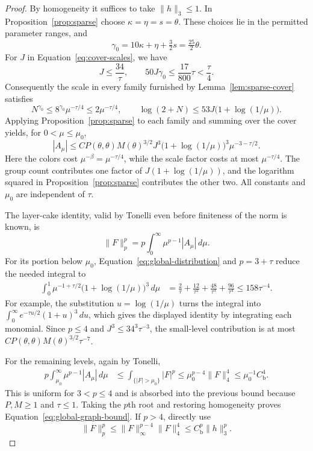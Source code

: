 \begin{proof}
By homogeneity it suffices to take $\|h\|_3\leq1$.
In Proposition~\ref{prop:sparse} choose
$\kappa=\eta=s=\theta$.  These choices lie in the permitted
parameter ranges, and
\[
 \gamma_0=10\kappa+\eta+\tfrac32s=\tfrac{25}{2}\theta.
\]
For $J$ in Equation~\eqref{eq:cover-scales}, we have
\begin{equation}\label{eq:exponent-budget}
 J\leq\frac{34}{\tau},\qquad
 50J\gamma_0\leq\frac{17}{800}\tau<\frac{\tau}{4}.
\end{equation}
Consequently the scale in every family furnished by
Lemma~\ref{lem:sparse-cover} satisfies
\[
 N^{\gamma_0}\leq8^{\gamma_0}\mu^{-\tau/4}
                      \leq2\mu^{-\tau/4},\qquad
 \log(2+N)\leq53J\bigl(1+\log(1/\mu)\bigr).
\]
Applying Proposition~\ref{prop:sparse} to each family and summing
over the cover yields, for $0<\mu\leq\mu_0$,
\begin{equation}\label{eq:global-distribution}
 |A_\mu|\leq
 C P(\theta,\theta)M(\theta)^{3/2}
 J^3\bigl(1+\log(1/\mu)\bigr)^3\mu^{-3-\tau/2}.
\end{equation}
Here the colors cost $\mu^{-\beta}=\mu^{-\tau/4}$, while
the scale factor costs at most $\mu^{-\tau/4}$.
The group count contributes one factor of
$J(1+\log(1/\mu))$, and the logarithm squared in
Proposition~\ref{prop:sparse} contributes the other two.
All constants and $\mu_0$ are independent of $\tau$.

The layer-cake identity, valid by Tonelli even before finiteness
of the norm is known, is
\[
 \|F\|_p^p=p\int_0^\infty\mu^{p-1}|A_\mu|\,d\mu.
\]
For its portion below $\mu_0$, Equation~\eqref{eq:global-distribution}
and $p=3+\tau$ reduce the needed integral to
\begin{align}
 \int_0^1\mu^{-1+\tau/2}\bigl(1+\log(1/\mu)\bigr)^3\,d\mu
 &=\frac2\tau+\frac{12}{\tau^2}
                  +\frac{48}{\tau^3}+\frac{96}{\tau^4}
 \leq158\tau^{-4}.\label{eq:layer-integral}
\end{align}
For example, the substitution $u=\log(1/\mu)$ turns the
integral into $\int_0^\infty e^{-\tau u/2}(1+u)^3\,du$,
which gives the displayed identity by integrating each monomial.
Since $p\leq4$ and $J^3\leq34^3\tau^{-3}$, the small-level
contribution is at most
$C P(\theta,\theta)M(\theta)^{3/2}\tau^{-7}$.

For the remaining levels, again by Tonelli,
\begin{align*}
 p\int_{\mu_0}^\infty\mu^{p-1}|A_\mu|\,d\mu
 &\leq\int_{\{|F|>\mu_0\}}|F|^p
 \leq\mu_0^{p-4}\|F\|_4^4
 \leq\mu_0^{-1}C_{\mathrm b}^4.
\end{align*}
This is uniform for $3<p\leq4$ and is absorbed into the previous
bound because $P,M\geq1$ and $\tau\leq1$.
Taking the $p$th root and restoring homogeneity proves
Equation~\eqref{eq:global-graph-bound}.
If $p>4$, directly use
\[
 \|F\|_p^p\leq\|F\|_\infty^{p-4}\|F\|_4^4
                 \leq C_{\mathrm b}^p\|h\|_3^p.
\]
\end{proof}

